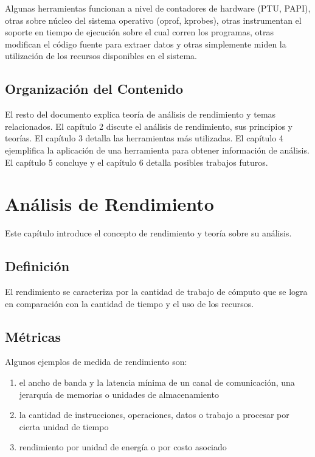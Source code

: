 \documentclass[a4paper]{report}
\begin{document}
\bigskip

Algunas herramientas funcionan a nivel de contadores de hardware (PTU, PAPI), otras sobre n\'ucleo del sistema operativo (oprof, kprobes),
otras instrumentan el soporte en tiempo de ejecuci\'on sobre el cual corren los programas, otras modifican el c\'odigo fuente
para extraer datos y otras simplemente miden la utilizaci\'on de los recursos disponibles en el sistema.

\section{Organizaci\'on del Contenido}

El resto del documento explica teor\'ia de an\'alisis de rendimiento y temas
relacionados. El cap\'itulo 2 discute el an\'alisis de rendimiento, sus principios y teor\'ias.
El cap\'itulo 3 detalla las herramientas m\'as utilizadas. El cap\'itulo 4 ejemplifica la
aplicaci\'on de una herramienta para obtener informaci\'on de an\'alisis.
El cap\'itulo 5 concluye y el cap\'itulo 6 detalla posibles trabajos futuros.

\chapter{An\'alisis de Rendimiento}

Este cap\'itulo introduce el concepto de rendimiento y teor\'ia sobre su an\'alisis.

\section{Definici\'on}

El rendimiento se caracteriza por la cantidad de trabajo de c\'omputo que se logra
en comparaci\'on con la cantidad de tiempo y el uso de los recursos.

\section{M\'etricas}

Algunos ejemplos de medida de rendimiento son:

\begin{enumerate}
\item el ancho de banda y la latencia m\'inima de un canal de comunicaci\'on, una jerarqu\'ia de memorias o unidades
  de almacenamiento
\item la cantidad de instrucciones, operaciones, datos o trabajo a procesar por cierta unidad de tiempo
\item rendimiento por unidad de energ\'ia o por costo asociado
\end{enumerate}
\end{document}

